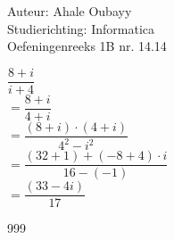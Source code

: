 \documentclass[a4paper]{article}
\begin{document}
  
\noindent \large Auteur: Ahale Oubayy \\
\noindent \large Studierichting: Informatica\\
\noindent \large Oefeningenreeks 1B nr. 14.14\\

\medskip

\normalsize

$ \dfrac{8 + i}{i + 4} $\\


$ = \dfrac{8 + i}{4 + i}                             $\\

$ = \dfrac{(8 + i) \cdot (4 + i)}{4^2 - i^2}         $\\

$ = \dfrac{(32 + 1) + (-8 + 4) \cdot i }{16 - (-1)}  $\\

$ = \dfrac{(33 - 4i)}{17}                            $\\


\begin{thebibliography}{999}
\end{thebibliography}
\end{document}
